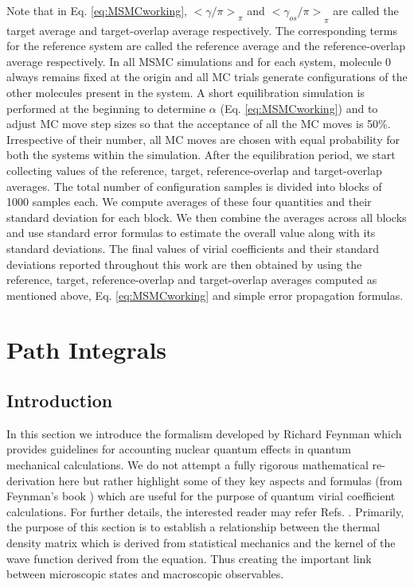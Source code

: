         Note that in Eq. \eqref{eq:MSMCworking}, ${<\gamma/\pi>}_\pi$ and ${<\gamma_{os}/\pi>}_\pi$ are called the target average and target-overlap average respectively. The corresponding terms for the reference system are called the reference average and the reference-overlap average respectively. In all MSMC simulations and for each system, molecule 0 always remains fixed at the origin and all MC trials generate configurations of the other molecules present in the system. A short equilibration simulation is performed at the beginning to determine $\alpha$ (Eq. \eqref{eq:MSMCworking}) and to adjust MC move step sizes so that the acceptance of all the MC moves is 50\%. Irrespective of their number, all MC moves are chosen with equal probability for both the systems within the simulation. After the equilibration period, we start collecting values of the reference, target, reference-overlap and target-overlap averages. The total number of configuration samples is divided into blocks of 1000 samples each. We compute averages of these four quantities and their standard deviation for each block. We then combine the averages across all blocks and use standard error formulas to estimate the overall value along with its standard deviations. The final values of virial coefficients and their standard deviations reported throughout this work are then obtained by using the reference, target, reference-overlap and target-overlap averages computed as mentioned above, Eq. \eqref{eq:MSMCworking} and simple error propagation formulas.

\section{Path Integrals}
    \subsection{Introduction}
    In this section we introduce the formalism developed by Richard Feynman \cite{Feynman} which provides guidelines for accounting nuclear quantum effects in quantum mechanical calculations. We do not attempt a fully rigorous mathematical re-derivation here but rather highlight some of they key aspects and formulas (from Feynman's book \cite{Feynman}) which are useful for the purpose of quantum virial coefficient calculations. For further details, the interested reader may refer Refs. \cite{Fosdick:1966vh,Ceperley1995,Muser1996,Marx1999,Cui1997,Diep2000,Patkowski2008}. Primarily, the purpose of this section is to establish a relationship between the thermal density matrix which is derived from statistical mechanics and the kernel of the wave function derived from the \Schrodinger{} equation. Thus creating the important link between microscopic states and macroscopic observables.

